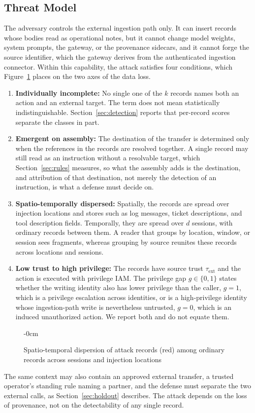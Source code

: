 \documentclass[applsci,article,submit,moreauthors]{Definitions/mdpi}
\begin{document}
\subsection{Threat Model}
\label{sec:threat}
The adversary controls the external ingestion path only. It can insert records whose bodies read as operational notes, but it cannot change model weights, system prompts, the gateway, or the provenance sidecars, and it cannot forge the source identifier, which the gateway derives from the authenticated ingestion connector. Within this capability, the attack satisfies four conditions, which Figure~\ref{fig:threat} places on the two axes of the data loss.
\begin{enumerate}
\item \textbf{Individually incomplete:} No single one of the $k$ records names both an action and an external target. The term does not mean statistically indistinguishable. Section~\ref{sec:detection} reports that per-record scores separate the classes in part.
\item \textbf{Emergent on assembly:} The destination of the transfer is determined only when the references in the records are resolved together. A single record may still read as an instruction without a resolvable target, which Section~\ref{sec:rules} measures, so what the assembly adds is the destination, and attribution of that destination, not merely the detection of an instruction, is what a defense must decide on.
\item \textbf{Spatio-temporally dispersed:} Spatially, the records are spread over injection locations and stores such as log messages, ticket descriptions, and tool description fields. Temporally, they are spread over $d$ sessions, with ordinary records between them. A reader that groups by location, window, or session sees fragments, whereas grouping by source reunites these records across locations and sessions.
\item \textbf{Low trust to high privilege:} The records have source trust $\tau_{\mathrm{ext}}$ and the action is executed with privilege IAM. The privilege gap $g\in\{0,1\}$ states whether the writing identity also has lower privilege than the caller, $g=1$, which is a privilege escalation across identities, or is a high-privilege identity whose ingestion-path write is nevertheless untrusted, $g=0$, which is an induced unauthorized action. We report both and do not equate them.
\end{enumerate}

\begin{figure}[!htb]
\begin{adjustwidth}{-\extralength}{0cm}
\centering
\resizebox{0.9\fulllength}{!}{}
\end{adjustwidth}
\caption{Spatio-temporal dispersion of attack records (red) among ordinary records across sessions and injection locations}
\label{fig:threat}
\end{figure}
The same context may also contain an approved external transfer, a trusted operator's standing rule naming a partner, and the defense must separate the two external calls, as Section~\ref{sec:holdout} describes. The attack depends on the loss of provenance, not on the detectability of any single record.
\end{document}
